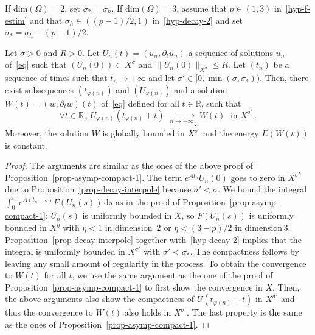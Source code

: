 \documentclass[10pt]{amsart}
\theoremstyle{definition}\newtheorem{defi}[theo]{Definition}\newtheorem{rema}[theo]{Remark}\newtheorem{exam}[theo]{Example}\newtheorem{exem}[theo]{Example}\newtheorem{nota}[theo]{Notation}
\newcommand{\RR}{\mathbb{R}}
\newcommand{\drm}{\mathrm{d}}
\let\oldforall\forall
\renewcommand*{\forall}{\mathrel{\oldforall}}
\begin{document}
\goodbreak

\begin{prop}\label{prop-asymp-compact-2}
If dim$(\Omega)=2$, set $\sigma_*=\sigma_h$. If dim$(\Omega)=3$, assume that $p\in(1,3)$ in~\eqref{hyp-f-estim} and that $\sigma_h\in ((p-1)/2,1)$ in~\eqref{hyp-decay-2} and set $\sigma_*=\sigma_h - (p-1)/2$.

Let $\sigma>0$ and $R>0$. Let $U_n(t)=(u_n,\partial_t u_n)$ a sequence of solutions $u_n$ of~\eqref{eq} such that $(U_n(0))\subset X^\sigma$ and $\|U_n(0)\|_{X^\sigma}\leq R$. Let $(t_n)$ be a sequence of times such that $t_n\rightarrow +\infty$ and let $\sigma'\in [0,\min(\sigma,\sigma_*))$. Then, there exist subsequences $(t_{\varphi(n)})$ and $(U_{\varphi(n)})$ and a solution $W(t)=(w,\partial_t w)(t)$ of~\eqref{eq} defined for all $t\in\RR$, such that
\[
\forall
t\in\RR\,,\,U_{\varphi(n)}(t_{\varphi(n)}+t)\,\xrightarrow[\;n\longrightarrow
+\infty\:]{}_,W(t)\;\text{ in } X^{\sigma'}\,.
\]
Moreover, the solution $W$ is globally bounded in $X^{\sigma'}$ and the energy $E(W(t))$ is constant.
\end{prop}
\begin{proof}
The arguments are similar as the ones of the above proof of Proposition~\ref{prop-asymp-compact-1}. The term $e^{At_n}U_n(0)$ goes to zero in $X^{\sigma'}$ due to Proposition~\ref{prop-decay-interpole} because $\sigma'<\sigma$. We bound the integral $\int_0^{t_n} e^{A(t_n-s)}F(U_n(s))\,\drm s$ as in the proof of Proposition~\ref{prop-asymp-compact-1}: $U_n(s)$ is uniformly bounded in $X$, so $F(U_n(s))$ is uniformly bounded in $X^\eta$ with $\eta<1$ in dimension~$2$ or $\eta<(3-p)/2$ in dimension\,$3$. Proposition~\ref{prop-decay-interpole} together with~\eqref{hyp-decay-2} implies that the integral is uniformly bounded in $X^{\sigma'}$ with $\sigma'<\sigma_*$. The compactness follows by leaving any small amount of regularity in the process. To obtain the convergence to $W(t)$ for all $t$, we use the same argument as the one of the proof of Proposition~\ref{prop-asymp-compact-1} to first show the convergence in $X$. Then, the above arguments also show the compactness of $U(t_{\varphi(n)}+t)$ in $X^{\sigma'}$ and thus the convergence to $W(t)$ also holds in $X^{\sigma'}$. The last property is the same as the ones of Proposition~\ref{prop-asymp-compact-1}.
\end{proof}
\end{document}
